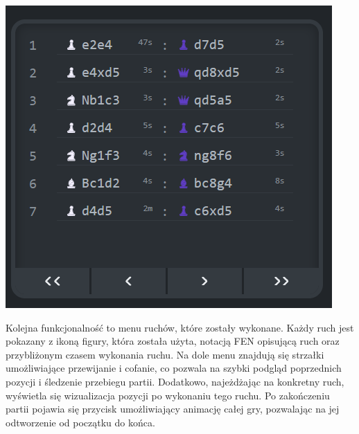 \documentclass[12pt,a4paper]{article}
\begin{document}
\vspace{1cm}

\begin{minipage}[t]{0.45\textwidth} 
    \vspace{0pt} 
    \centering 
    \includegraphics[width=\linewidth]{zdj/ins_min_moves.png} 
\end{minipage} 
\hfill 
\begin{minipage}[t]{0.45\textwidth} 
    \vspace{0pt} 
    \raggedright 
    Kolejna funkcjonalność to menu ruchów, które zostały wykonane. Każdy ruch jest pokazany z ikoną figury, która została użyta, notacją FEN opisującą ruch oraz przybliżonym czasem wykonania ruchu. Na dole menu znajdują się strzałki umożliwiające przewijanie i cofanie, co pozwala na szybki podgląd poprzednich pozycji i śledzenie przebiegu partii. Dodatkowo, najeżdżając na konkretny ruch, wyświetla się wizualizacja pozycji po wykonaniu tego ruchu. Po zakończeniu partii pojawia się przycisk umożliwiający animację całej gry, pozwalając na jej odtworzenie od początku do końca.
\end{minipage}

\vspace{1cm}
\end{document}
